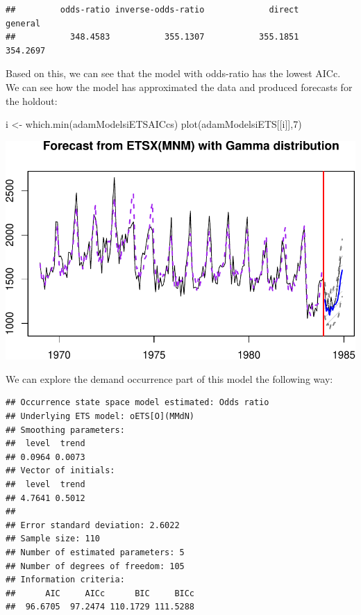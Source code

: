 \documentclass[
]{book}
\newenvironment{Shaded}{\begin{snugshade}}{\end{snugshade}}
\newcommand{\DecValTok}[1]{\textcolor[rgb]{0.00,0.00,0.81}{#1}}
\newcommand{\FunctionTok}[1]{\textcolor[rgb]{0.00,0.00,0.00}{#1}}
\newcommand{\NormalTok}[1]{#1}
\newcommand{\OtherTok}[1]{\textcolor[rgb]{0.56,0.35,0.01}{#1}}
\newcommand{\SpecialCharTok}[1]{\textcolor[rgb]{0.00,0.00,0.00}{#1}}
\theoremstyle{definition}
\theoremstyle{definition}
\theoremstyle{definition}
\theoremstyle{definition}
\theoremstyle{remark}
\begin{document}
\begin{verbatim}
##         odds-ratio inverse-odds-ratio             direct            general 
##           348.4583           355.1307           355.1851           354.2697
\end{verbatim}

Based on this, we can see that the model with odds-ratio has the lowest AICc. We can see how the model has approximated the data and produced forecasts for the holdout:

\begin{Shaded}
\begin{Highlighting}[]
\NormalTok{i }\OtherTok{\textless{}{-}} \FunctionTok{which.min}\NormalTok{(adamModelsiETSAICcs)}
\FunctionTok{plot}\NormalTok{(adamModelsiETS[[i]],}\DecValTok{7}\NormalTok{)}
\end{Highlighting}
\end{Shaded}

\includegraphics{adam_files/figure-latex/unnamed-chunk-123-1.pdf}

We can explore the demand occurrence part of this model the following way:

\begin{Shaded}
\end{Shaded}

\begin{verbatim}
## Occurrence state space model estimated: Odds ratio
## Underlying ETS model: oETS[O](MMdN)
## Smoothing parameters:
##  level  trend 
## 0.0964 0.0073 
## Vector of initials:
##  level  trend 
## 4.7641 0.5012 
## 
## Error standard deviation: 2.6022
## Sample size: 110
## Number of estimated parameters: 5
## Number of degrees of freedom: 105
## Information criteria: 
##      AIC     AICc      BIC     BICc 
##  96.6705  97.2474 110.1729 111.5288
\end{verbatim}
\end{document}
